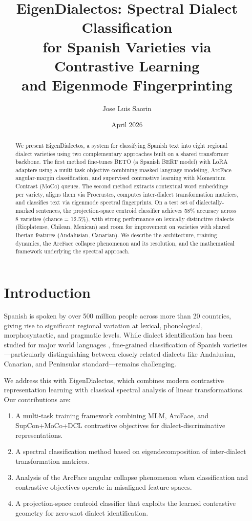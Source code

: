 \documentclass[11pt,a4paper]{article}
\title{EigenDialectos: Spectral Dialect Classification\\for Spanish Varieties via Contrastive Learning\\and Eigenmode Fingerprinting}
\author{Jose Luis Saorin}
\date{April 2026}
\begin{document}
\maketitle

\begin{abstract}
We present EigenDialectos, a system for classifying Spanish text into eight
regional dialect varieties using two complementary approaches built on a
shared transformer backbone. The first method fine-tunes BETO (a Spanish BERT
model) with LoRA adapters using a multi-task objective combining masked language
modeling, ArcFace angular-margin classification, and supervised contrastive
learning with Momentum Contrast (MoCo) queues. The second method extracts
contextual word embeddings per variety, aligns them via Procrustes, computes
inter-dialect transformation matrices, and classifies text via eigenmode
spectral fingerprints. On a test set of dialectally-marked sentences, the
projection-space centroid classifier achieves 58\% accuracy across 8 varieties
(chance = 12.5\%), with strong performance on lexically distinctive dialects
(Rioplatense, Chilean, Mexican) and room for improvement on varieties with
shared Iberian features (Andalusian, Canarian). We describe the architecture,
training dynamics, the ArcFace collapse phenomenon and its resolution, and the
mathematical framework underlying the spectral approach.
\end{abstract}

\section{Introduction}

Spanish is spoken by over 500 million people across more than 20 countries,
giving rise to significant regional variation at lexical, phonological,
morphosyntactic, and pragmatic levels. While dialect identification has been
studied for major world languages \citep{zampieri2017findings}, fine-grained
classification of Spanish varieties---particularly distinguishing between
closely related dialects like Andalusian, Canarian, and Peninsular
standard---remains challenging.

We address this with EigenDialectos, which combines modern contrastive
representation learning with classical spectral analysis of linear
transformations. Our contributions are:

\begin{enumerate}
    \item A multi-task training framework combining MLM, ArcFace, and
    SupCon+MoCo+DCL contrastive objectives for dialect-discriminative
    representations.
    \item A spectral classification method based on eigendecomposition of
    inter-dialect transformation matrices.
    \item Analysis of the ArcFace angular collapse phenomenon when
    classification and contrastive objectives operate in misaligned feature
    spaces.
    \item A projection-space centroid classifier that exploits the learned
    contrastive geometry for zero-shot dialect identification.
\end{enumerate}
\end{document}
